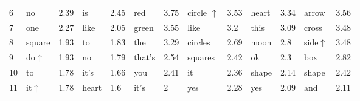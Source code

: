 \begin{figure*}
{{\begin{tabular*}{0.9\textwidth}{@{\extracolsep{\fill}}lllllllllllll}
        6 & \cellcolor[gray]{0.85}\hspace{1ex}no & 2.39 & \hspace{1ex}is & 2.45 & \hspace{1ex}red & 3.75 & \hspace{1ex}circle\hspace{1.5ex} $\bm{\uparrow}$ & 3.53 & \hspace{1ex}heart & 3.34 & \hspace{1ex}arrow & 3.56\\
        7 & \hspace{1ex}one & 2.27 & \hspace{1ex}like & 2.05 & \hspace{1ex}green & 3.55 & \hspace{1ex}like & 3.2 & \hspace{1ex}this & 3.09 & \hspace{1ex}cross & 3.48\\
        8 & \hspace{1ex}square & 1.93 & \hspace{1ex}to & 1.83 & \hspace{1ex}the & 3.29 & \hspace{1ex}circles & 2.69 & \hspace{1ex}moon & 2.8 & \hspace{1ex}side\hspace{1.6ex}$\bm{\uparrow}$ & 3.48\\
        9 & \hspace{1ex}do\hspace{3ex}$\bm{\uparrow}$ & 1.93 & \cellcolor[gray]{0.85}\hspace{1ex}no & 1.79 & \hspace{1ex}that's & 2.54 & \hspace{1ex}squares & 2.42 & \hspace{1ex}ok & 2.3 & \hspace{1ex}box & 2.82\\
        10 & \hspace{1ex}to & 1.78 & \hspace{1ex}it's & 1.66 & \hspace{1ex}you & 2.41 & \hspace{1ex}it & 2.36 & \hspace{1ex}shape & 2.14 & \hspace{1ex}shape & 2.42\\
        11 & \hspace{1ex}it\hspace{4.2ex}$\bm{\uparrow}$ & 1.78 & \hspace{1ex}heart & 1.6 & \hspace{1ex}it's & 2 & \hspace{1ex}yes & 2.28 & \hspace{1ex}yes & 2.09 & \hspace{1ex}and & 2.11\\

\end{tabular*}}}
\end{figure*}
